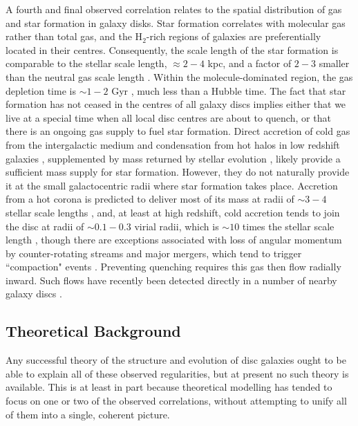 \documentclass[useAMS,usenatbib]{mn2e}
\begin{document}
A fourth and final observed correlation relates to the spatial distribution of gas and star formation in galaxy disks. Star formation correlates with molecular gas rather than total gas, and the H$_2$-rich regions of galaxies are preferentially located in their centres. Consequently, the scale length of the star formation is comparable to the stellar scale length, $\approx 2-4$ kpc, and a factor of $2-3$ smaller than the neutral gas scale length  \citep{regan01a, leroy08a, schruba11a, bigiel12a}. Within the molecule-dominated region, the gas depletion time is $\sim 1-2$ Gyr \citep{bigiel08a, leroy13a}, much less than a Hubble time. The fact that star formation has not ceased in the centres of all galaxy discs implies either that we live at a special time when all local disc centres are about to quench, or that there is an ongoing gas supply to fuel star formation. Direct accretion of cold gas from the intergalactic medium \citep[e.g.,][]{keres05a, dekel06a, dekel09b, wetzel15a} and condensation from hot halos in low redshift galaxies \citep{marinacci10a, joung12a, fraternali13a, hobbs13a}, supplemented by mass returned by stellar evolution \citep{leitner11a}, likely provide a sufficient mass supply for star formation. However, they do not naturally provide it at the small galactocentric radii where star formation takes place. Accretion from a hot corona is predicted to deliver most of its mass at radii of $\sim 3-4$ stellar scale lengths \citep[e.g.,][]{marasco12a}, and, at least at high redshift, cold accretion tends to join the disc at radii of $\sim 0.1 - 0.3$ virial radii, which is $\sim 10$ times the stellar scale length \citep{danovich15a}, though there are exceptions associated with loss of angular momentum by counter-rotating streams and major mergers, which tend to trigger ``compaction" events \citep{zolotov15a, tacchella16a, tacchella16b}. Preventing quenching requires this gas then flow radially inward. Such flows have recently been detected directly in a number of nearby galaxy discs \citep{schmidt16a}.

\subsection{Theoretical Background}
\label{ssec:theory}

Any successful theory of the structure and evolution of disc galaxies ought to be able to explain all of these observed regularities, but at present no such theory is available. This is at least in part because theoretical modelling has tended to focus on one or two of the observed correlations, without attempting to unify all of them into a single, coherent picture.
\end{document}
